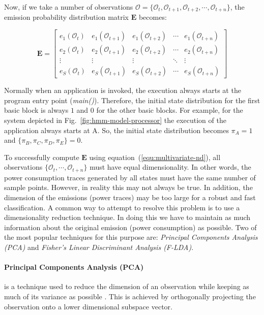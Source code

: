 \documentclass[lnicst]{svmultln}
\begin{document}
Now, if we take a number of observations $\mathcal{O}=\{ \mathcal{O}_{t}, \mathcal{O}_{t+1}, \mathcal{O}_{t+2}, \cdots, \mathcal{O}_{t+n} \}$, the emission probability distribution matrix $\mathbf{E}$ becomes:

\begin{equation}
\mathbf{E} = \begin{bmatrix} e_{1}(\mathcal{O}_{t}) & e_{1}(\mathcal{O}_{t+1}) & e_{1}(\mathcal{O}_{t+2}) & \cdots & e_{1}(\mathcal{O}_{t+n}) \\
														 e_{2}(\mathcal{O}_{t}) & e_{2}(\mathcal{O}_{t+1}) & e_{2}(\mathcal{O}_{t+2}) & \cdots & e_{2}(\mathcal{O}_{t+n}) \\
														         \vdots         &           \vdots         &           \vdots         & \ddots &             \vdots       \\
														 e_{S}(\mathcal{O}_{t}) & e_{S}(\mathcal{O}_{t+1}) & e_{S}(\mathcal{O}_{t+2}) & \cdots & e_{S}(\mathcal{O}_{t+n})
						 \end{bmatrix}
\label{equ:epd-matrix}
\end{equation}

Normally when an application is invoked, the execution always starts at the program entry point (\emph{main()}). Therefore, the initial state distribution for the first basic block is always $1$ and $0$ for the other basic blocks. For example, for the system depicted in Fig.~\ref{fig:hmm-model-processor} the execution of the application always starts at A. So, the initial state distribution becomes $\pi_{A}=1$ and $\{ \pi_{B},\pi_{C},\pi_{D},\pi_{E}\}=0$.

To successfully compute $\mathbf{E}$ using equation~(\ref{equ:multivariate-nd}), all observations $\{\mathcal{O}_{t}, \cdots, \mathcal{O}_{t+n}\}$ must have equal dimensionality. In other words, the power consumption traces generated by all states must have the same number of sample points. However, in reality this may not always be true. In addition, the dimension of the emissions (power traces) may be too large for a robust and fast classification. A common way to attempt to resolve this problem is to use a dimensionality reduction technique. In doing this we have to maintain as much information about the original emission (power consumption) as possible. Two of the most popular techniques for this purpose are: \emph{Principal Components Analysis (PCA)} and \emph{Fisher's Linear Discriminant Analysis (F-LDA)}.

\paragraph{\textbf{Principal Components Analysis (PCA)}} is a technique used to reduce the dimension of an observation while keeping as much of its variance as possible \cite{CSD-11-JAM}. This is achieved by orthogonally projecting the observation onto a lower dimensional subspace vector.
\end{document}
